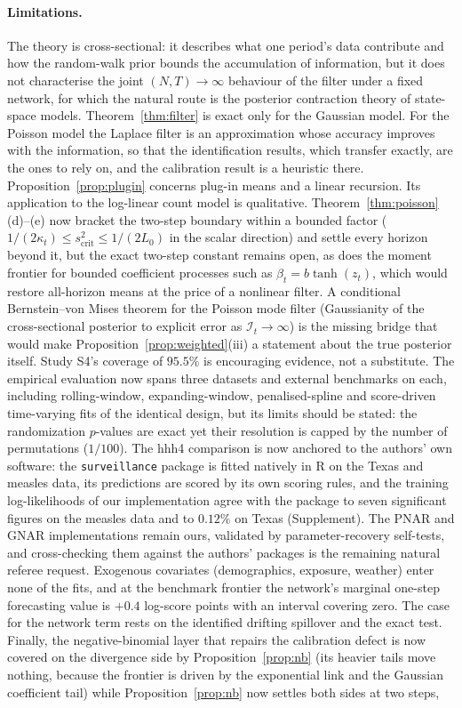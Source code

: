\documentclass[12pt]{article}
\theoremstyle{plain}
\theoremstyle{definition}
\theoremstyle{remark}
\newcommand{\calI}{\mathcal{I}}
\begin{document}
\paragraph{Limitations.} The theory is cross-sectional: it describes what one period's data contribute and how the random-walk prior bounds the accumulation of information, but it does not characterise the joint $(N,T)\to\infty$ behaviour of the filter under a fixed network, for which the natural route is the posterior contraction theory of state-space models. Theorem~\ref{thm:filter} is exact only for the Gaussian model. For the Poisson model the Laplace filter is an approximation whose accuracy improves with the information, so that the identification results, which transfer exactly, are the ones to rely on, and the calibration result is a heuristic there. Proposition~\ref{prop:plugin} concerns plug-in means and a linear recursion. Its application to the log-linear count model is qualitative. Theorem~\ref{thm:poisson}(d)--(e) now bracket the two-step boundary within a bounded factor ($1/(2\kappa_t)\le s^2_{\mathrm{crit}}\le1/(2L_0)$ in the scalar direction) and settle every horizon beyond it, but the exact two-step constant remains open, as does the moment frontier for bounded coefficient processes such as $\beta_t=b\tanh(z_t)$, which would restore all-horizon means at the price of a nonlinear filter. A conditional Bernstein--von Mises theorem for the Poisson mode filter (Gaussianity of the cross-sectional posterior to explicit error as $\calI_t\to\infty$) is the missing bridge that would make Proposition~\ref{prop:weighted}(iii) a statement about the true posterior itself. Study S4's coverage of $95.5\%$ is encouraging evidence, not a substitute. The empirical evaluation now spans three datasets and external benchmarks on each, including rolling-window, expanding-window, penalised-spline and score-driven time-varying fits of the identical design, but its limits should be stated: the randomization $p$-values are exact yet their resolution is capped by the number of permutations ($1/100$). The hhh4 comparison is now anchored to the authors' own software: the \texttt{surveillance} package is fitted natively in R on the Texas and measles data, its predictions are scored by its own scoring rules, and the training log-likelihoods of our implementation agree with the package to seven significant figures on the measles data and to $0.12\%$ on Texas (Supplement). The PNAR and GNAR implementations remain ours, validated by parameter-recovery self-tests, and cross-checking them against the authors' packages is the remaining natural referee request. Exogenous covariates (demographics, exposure, weather) enter none of the fits, and at the benchmark frontier the network's marginal one-step forecasting value is $+0.4$ log-score points with an interval covering zero. The case for the network term rests on the identified drifting spillover and the exact test. Finally, the negative-binomial layer that repairs the calibration defect is now covered on the divergence side by Proposition~\ref{prop:nb} (its heavier tails move nothing, because the frontier is driven by the exponential link and the Gaussian coefficient tail) while Proposition~\ref{prop:nb} now settles both sides at two steps, 
\end{document}
